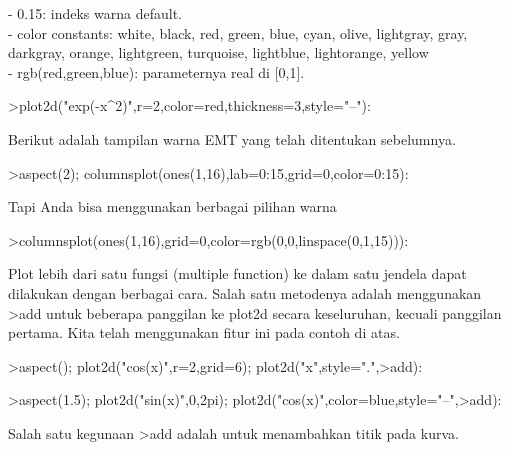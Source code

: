 \documentclass{article}
\begin{document}
\begin{eulernotebook}
\begin{eulercomment}
\begin{eulercomment}
\begin{eulercomment}
\begin{eulercomment}
\begin{eulercomment}
- 0.15: indeks warna default.\\
- color constants: white, black, red, green, blue, cyan, olive,
lightgray, gray, darkgray, orange, lightgreen, turquoise, lightblue,
lightorange, yellow\\
- rgb(red,green,blue): parameternya real di [0,1].
\end{eulercomment}
\begin{eulerprompt}
>plot2d("exp(-x^2)",r=2,color=red,thickness=3,style="--"):
\end{eulerprompt}
\begin{eulercomment}
Berikut adalah tampilan warna EMT yang telah ditentukan sebelumnya.
\end{eulercomment}
\begin{eulerprompt}
>aspect(2); columnsplot(ones(1,16),lab=0:15,grid=0,color=0:15):
\end{eulerprompt}
\begin{eulercomment}
Tapi Anda bisa menggunakan berbagai pilihan warna
\end{eulercomment}
\begin{eulerprompt}
>columnsplot(ones(1,16),grid=0,color=rgb(0,0,linspace(0,1,15))):
\end{eulerprompt}
\begin{eulercomment}
Plot lebih dari satu fungsi (multiple function) ke dalam satu jendela
dapat dilakukan dengan berbagai cara. Salah satu metodenya adalah
menggunakan \textgreater{}add untuk beberapa panggilan ke plot2d secara
keseluruhan, kecuali panggilan pertama. Kita telah menggunakan fitur
ini pada contoh di atas.
\end{eulercomment}
\begin{eulerprompt}
>aspect(); plot2d("cos(x)",r=2,grid=6); plot2d("x",style=".",>add):
\end{eulerprompt}
\begin{eulerprompt}
>aspect(1.5); plot2d("sin(x)",0,2pi); plot2d("cos(x)",color=blue,style="--",>add):
\end{eulerprompt}
\begin{eulercomment}
Salah satu kegunaan \textgreater{}add adalah untuk menambahkan titik pada kurva.
\end{eulercomment}

\end{eulercomment}
\end{eulercomment}
\end{eulercomment}
\end{eulercomment}
\end{eulernotebook}
\end{document}
